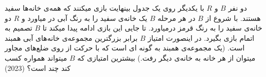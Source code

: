 دو نفر $B$ و $R$ با یکدیگر روی یک جدول بینهایت بازی میکنند که همه‌ی خانه‌ها سفید هستند.
با شروع از $B$ در هر مرحله $B$ یک خانه‌ی سفید را به رنگ آبی در میاورد و $R$ دو خانه‌ی سفید را به رنگ قرمز درمیاورد.
تا جایی این بازی ادامه پیدا میکند تا $B$ تصمیم به اتمام بازی بگیرد. 
در اینصورت امتیاز $B$ برابر بزرگترین مجموعه‌ی خانه‌های آبی همبند است. (یک مجموعه‌ی همبند به گونه ای است که با حرکت از روی ضلع‌های مجاور میتوان از هر خانه به خانه‌ی دیگر رفت.)
بیشترین امتیازی که $B$ میتواند همواره کسب کند چند است؟
(2023)